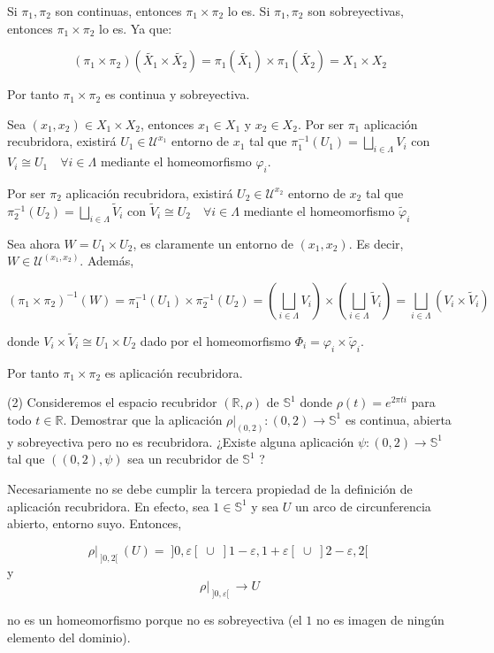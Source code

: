 \documentclass[
  a4paper,
  spanish,
  12pt,
]{scrartcl}
\begin{document}
\begin{sol}
Si $\pi_1, \pi_2$ son continuas, entonces $\pi_1 \times \pi_2$ lo es.
Si $\pi_1, \pi_2$ son sobreyectivas, entonces $\pi_1 \times \pi_2$ lo es. Ya que:

$$
(\pi_1 \times \pi_2)(\tilde{X_1} \times \tilde{X_2}) = \pi_1(\tilde{X_1}) \times \pi_1(\tilde{X_2}) = X_1 \times X_2
$$

Por tanto $\pi_1 \times \pi_2$ es continua y sobreyectiva.

Sea $(x_1, x_2) \in X_1 \times X_2$, entonces $x_1 \in X_1$ y $x_2 \in X_2$.
Por ser $\pi_1$ aplicación recubridora, existirá $U_1 \in \mathcal{U}^{x_1}$ entorno de $x_1$ tal que
$\pi_1^{-1}(U_1) = \bigsqcup_{i \in \Lambda} V_i$ con $V_i \cong U_1 \quad \forall i \in \Lambda$ mediante
el homeomorfismo $\varphi_i$.

Por ser $\pi_2$ aplicación recubridora, existirá $U_2 \in \mathcal{U}^{x_2}$ entorno de $x_2$ tal que
$\pi_2^{-1}(U_2) = \bigsqcup_{i \in \Lambda} \tilde{V}_i$ con $\tilde{V}_i \cong U_2 \quad \forall i \in \Lambda$ mediante
el homeomorfismo $\tilde{\varphi}_i$

Sea ahora $W = U_1 \times U_2$, es claramente un entorno de $(x_1, x_2)$. Es decir, $W \in \mathcal{U}^{(x_1, x_2)}$.
Además,

$$
(\pi_1 \times \pi_2)^{-1}(W) = \pi_1^{-1}(U_1) \times \pi_2^{-1}(U_2) = 
\left(\bigsqcup_{i \in \Lambda} V_i \right)  \times \left(\bigsqcup_{i \in \Lambda} \tilde{V}_i \right) 
= \bigsqcup_{i \in \Lambda} (V_i \times \tilde{V}_i )
$$

donde $V_i \times \tilde{V}_i \cong U_1 \times U_2$ dado por el homeomorfismo $\Phi_i = \varphi_i \times \tilde{\varphi}_i$.

Por tanto $\pi_1 \times \pi_2$ es aplicación recubridora.
\end{sol}

\begin{ejer}
(2) Consideremos el espacio recubridor $(\mathbb{R}, \rho)$ de $\mathbb{S}^{1}$ donde $\rho(t)=e^{2 \pi t i}$ para todo $t \in \mathbb{R}$. Demostrar que la aplicación $\left.\rho\right|_{(0,2)}:(0,2) \rightarrow \mathbb{S}^{1}$ es continua, abierta y sobreyectiva pero no es recubridora. ¿Existe alguna aplicación $\psi:(0,2) \rightarrow \mathbb{S}^{1}$ tal que $((0,2), \psi)$ sea un recubridor de $\mathbb{S}^{1}$ ?\\
\end{ejer}

\begin{sol}
Necesariamente no se debe cumplir la tercera propiedad de la definición de aplicación recubridora.
En efecto, sea $1 \in \mathbb{S}^1$ y sea $U$ un arco de circunferencia abierto, entorno suyo. Entonces,

$$
\rho\vert_{\;]0,2[\;} (U) = \;]0, \varepsilon[\; \cup \;]1-\varepsilon, 1+\varepsilon[\; \cup \;]2-\varepsilon, 2[\;
$$
y 
$$
\rho\vert_{\;]0, \varepsilon[\;} \to U
$$

no es un homeomorfismo porque no es sobreyectiva (el \( 1 \) no es imagen de ningún elemento del dominio).

\end{sol}
\end{document}
